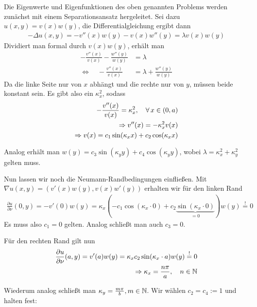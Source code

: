 \documentclass{article}
\begin{document}
Die Eigenwerte und Eigenfunktionen des oben genannten Problems werden zunächst mit einem Separationsansatz hergeleitet.
Sei dazu $u(x,y) = v(x)w(y)$, die Differentialgleichung ergibt dann
\begin{align*}
	- \Delta u(x,y) = -v''(x) w(y) - v(x) w''(y) = \lambda v(x)w(y)
\end{align*}
Dividiert man formal durch $v(x)w(y)$, erhält man
\begin{align*}
	-\frac{v''(x)}{v(x)} - \frac{w''(y)}{w(y)} &= \lambda \\
	\Leftrightarrow \quad -\frac{v''(x)}{v(x)} &= \lambda + \frac{w''(y)}{w(y)}
\end{align*}
Da die linke Seite nur von $x$ abhängt und die rechte nur von $y$, müssen beide konstant sein. Es gibt also ein $\kappa_{x}^2$, sodass
\begin{align*}
	-\frac{v''(x)}{v(x)} = \kappa_{x}^2, \quad \forall \, x \in (0,a) \\
	\Rightarrow v''(x) = -\kappa_{x}^2 v(x) \\
	\Rightarrow v(x) = c_1 \sin(\kappa_{x} x) + c_2 \cos(\kappa_{x} x)
\end{align*}

Analog erhält man $w(y) = c_3 \sin(\kappa_{y} y) + c_4 \cos(\kappa_{y} y)$, wobei $\lambda = \kappa_{x}^2 + \kappa_{y}^2$ gelten muss.

Nun lassen wir noch die Neumann-Randbedingungen einfließen. Mit $\nabla u(x,y) = (v'(x)w(y), v(x)w'(y))$ erhalten wir für den linken Rand
\begin{align*}
	\frac{\partial u}{\partial \nu}(0,y) = - v'(0)w(y) = \kappa_{x}(- c_1 \cos(\kappa_{x} \cdot 0) + c_2 \underbrace{\sin(\kappa_{x} \cdot 0)}_{=0})w(y) \stackrel{!}{=} 0
\end{align*}
Es muss also $c_1 = 0$ gelten. Analog schließt man auch $c_3 = 0$.

Für den rechten Rand gilt nun
\begin{align*}
	\frac{\partial u}{\partial \nu}(a,y) = v'(a)w(y) = \kappa_{x} c_2 \sin(\kappa_{x} \cdot a)w(y) \stackrel{!}{=} 0 \\
	\Rightarrow \kappa_x = \frac{n \pi}{a}, \quad n \in \mathbb{N}
\end{align*}

Wiederum analog schließt man $\kappa_y = \frac{m \pi}{b}, m \in \mathbb{N}$. Wir wählen $c_2 = c_4 := 1$ und halten fest:
\end{document}
